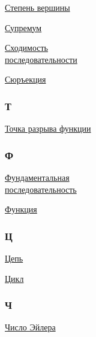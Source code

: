 \begin{multicols}{3}
\hyperlink{def:degree_of_vertex}{Степень вершины}

\hyperlink{def:supremum}{Супремум}

\hyperlink{def:convergence_of_sequence}{Сходимость\\последовательности}

\hyperlink{def:surjection}{Сюръекция}

\subsubsection*{Т}
\hyperlink{def:point_of_discontinuity_of_function}{Точка разрыва функции}

\subsubsection*{Ф}
\hyperlink{def:fundamental_sequence}{Фундаментальная\\последовательность}

\hyperlink{def:function}{Функция}

\subsubsection*{Ц}
\hyperlink{def:trail}{Цепь}

\hyperlink{def:cycle}{Цикл}

\subsubsection*{Ч}
\hyperlink{def:Euler's_number}{Число Эйлера}
\end{multicols}